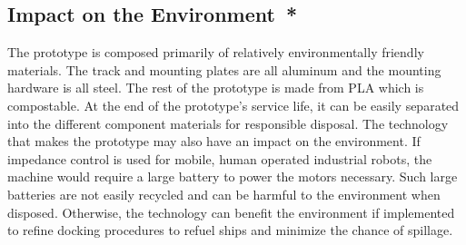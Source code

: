 
\subsection*{Impact on the Environment{{\color{red}\ *}}}
The prototype is composed primarily of relatively environmentally friendly materials. The track and mounting plates are all aluminum and the mounting hardware is all steel. The rest of the prototype is made from PLA which is compostable. At the end of the prototype's service life, it can be easily separated into the different component materials for responsible disposal. The technology that makes the prototype may also have an impact on the environment. If impedance control is used for mobile, human operated industrial robots, the machine would require a large battery to power the motors necessary. Such large batteries are not easily recycled and can be harmful to the environment when disposed. Otherwise, the technology can benefit the environment if implemented to refine docking procedures to refuel ships and minimize the chance of spillage. 